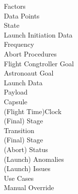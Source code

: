 \documentclass[letterpaper]{article}
\begin{document}
Factors\\
Data Points\\
State\\
Launch Initiation Data\\
Frequency\\
Abort Procedures\\
Flight Congtroller Goal\\
Astronoaut Goal\\
Launch Data\\
Payload\\
Capsule\\
(Flight Time)Clock\\
(Final) Stage\\
Transition\\
(Final) Stage\\
(Abort) Status\\
(Launch) Anomalies\\
(Launch) Issues\\
Use Cases\\
Manual Override\\
\end{document}
